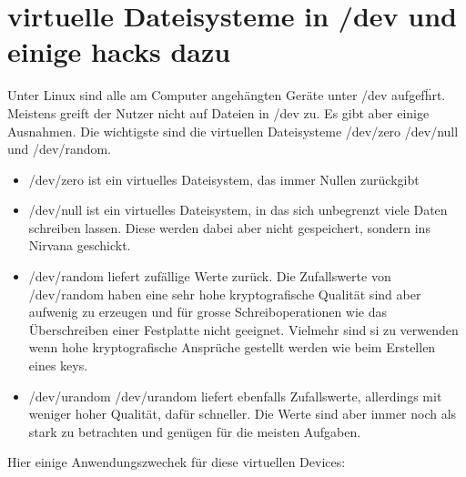 \section{virtuelle Dateisysteme in /dev und einige hacks dazu}
Unter Linux sind alle am Computer angeh\"angten Ger\"ate unter /dev aufgef\"hrt. Meistens greift der Nutzer nicht auf Dateien in /dev zu. Es gibt aber einige Ausnahmen. Die wichtigste sind die virtuellen Dateisysteme /dev/zero /dev/null und /dev/random.\\
\begin{itemize}
\item /dev/zero ist ein virtuelles Dateisystem, das immer Nullen zur\"uckgibt
\item /dev/null ist ein virtuelles Dateisystem, in das sich unbegrenzt viele Daten schreiben lassen. Diese werden dabei aber nicht gespeichert, sondern ins Nirvana geschickt.
\item /dev/random liefert zuf\"allige Werte zur\"uck. Die Zufallswerte von /dev/random haben eine sehr hohe kryptografische Qualit\"at sind aber aufwenig zu erzeugen und f\"ur grosse Schreiboperationen wie das \"Uberschreiben einer Festplatte nicht geeignet. Vielmehr sind si zu verwenden wenn hohe kryptografische Anspr\"uche gestellt werden wie beim Erstellen eines keys.
\item /dev/urandom /dev/urandom liefert ebenfalls Zufallswerte, allerdings mit weniger hoher Qualit\"at, daf\"ur schneller. Die Werte sind aber immer noch als stark zu betrachten und gen\"ugen f\"ur die meisten Aufgaben.
\end{itemize}
Hier einige Anwendungszwechek f\"ur diese virtuellen Devices:
